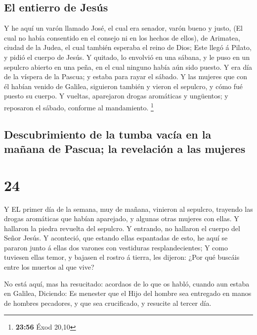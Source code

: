 \hypertarget{el-entierro-de-jesuxfas}{%
\subsection{El entierro de Jesús}\label{el-entierro-de-jesuxfas}}

 Y he aquí un varón llamado José, el cual era senador,
varón bueno y justo,  (El cual no había consentido en el
consejo ni en los hechos de ellos), de Arimatea, ciudad de la Judea, el
cual también esperaba el reino de Dios;  Este llegó á
Pilato, y pidió el cuerpo de Jesús.  Y quitado, lo envolvió
en una sábana, y le puso en un sepulcro abierto en una peña, en el cual
ninguno había aún sido puesto.  Y era día de la víspera de
la Pascua; y estaba para rayar el sábado.  Y las mujeres
que con él habían venido de Galilea, siguieron también y vieron el
sepulcro, y cómo fué puesto su cuerpo.  Y vueltas,
aparejaron drogas aromáticas y ungüentos; y reposaron el sábado,
conforme al mandamiento. \footnote{\textbf{23:56} Éxod 20,10}

\hypertarget{descubrimiento-de-la-tumba-vacuxeda-en-la-mauxf1ana-de-pascua-la-revelaciuxf3n-a-las-mujeres}{%
\subsection{Descubrimiento de la tumba vacía en la mañana de Pascua; la
revelación a las
mujeres}\label{descubrimiento-de-la-tumba-vacuxeda-en-la-mauxf1ana-de-pascua-la-revelaciuxf3n-a-las-mujeres}}

\hypertarget{section-23}{%
\section{24}\label{section-23}}

 Y EL primer día de la semana, muy de mañana, vinieron al
sepulcro, trayendo las drogas aromáticas que habían aparejado, y algunas
otras mujeres con ellas.  Y hallaron la piedra revuelta del
sepulcro.  Y entrando, no hallaron el cuerpo del Señor
Jesús.  Y aconteció, que estando ellas espantadas de esto,
he aquí se pararon junto á ellas dos varones con vestiduras
resplandecientes;  Y como tuviesen ellas temor, y bajasen el
rostro á tierra, les dijeron: ¿Por qué buscáis entre los muertos al que
vive?

 No está aquí, mas ha resucitado: acordaos de lo que os
habló, cuando aun estaba en Galilea,  Diciendo: Es menester
que el Hijo del hombre sea entregado en manos de hombres pecadores, y
que sea crucificado, y resucite al tercer día.

